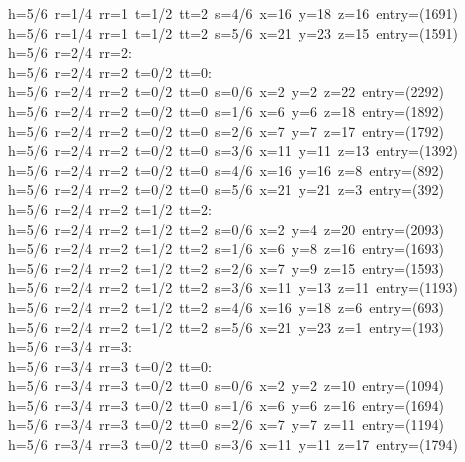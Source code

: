 \begin{tabbing}
h=5/6\ r=1/4\ rr=1\ t=1/2\ tt=2\ s=4/6\ x=16\ y=18\ z=16\ entry=(1691)\\[0pt]
h=5/6\ r=1/4\ rr=1\ t=1/2\ tt=2\ s=5/6\ x=21\ y=23\ z=15\ entry=(1591)\\[0pt]
h=5/6\ r=2/4\ rr=2:\\[0pt]
h=5/6\ r=2/4\ rr=2\ t=0/2\ tt=0:\\[0pt]
h=5/6\ r=2/4\ rr=2\ t=0/2\ tt=0\ s=0/6\ x=2\ y=2\ z=22\ entry=(2292)\\[0pt]
h=5/6\ r=2/4\ rr=2\ t=0/2\ tt=0\ s=1/6\ x=6\ y=6\ z=18\ entry=(1892)\\[0pt]
h=5/6\ r=2/4\ rr=2\ t=0/2\ tt=0\ s=2/6\ x=7\ y=7\ z=17\ entry=(1792)\\[0pt]
h=5/6\ r=2/4\ rr=2\ t=0/2\ tt=0\ s=3/6\ x=11\ y=11\ z=13\ entry=(1392)\\[0pt]
h=5/6\ r=2/4\ rr=2\ t=0/2\ tt=0\ s=4/6\ x=16\ y=16\ z=8\ entry=(892)\\[0pt]
h=5/6\ r=2/4\ rr=2\ t=0/2\ tt=0\ s=5/6\ x=21\ y=21\ z=3\ entry=(392)\\[0pt]
h=5/6\ r=2/4\ rr=2\ t=1/2\ tt=2:\\[0pt]
h=5/6\ r=2/4\ rr=2\ t=1/2\ tt=2\ s=0/6\ x=2\ y=4\ z=20\ entry=(2093)\\[0pt]
h=5/6\ r=2/4\ rr=2\ t=1/2\ tt=2\ s=1/6\ x=6\ y=8\ z=16\ entry=(1693)\\[0pt]
h=5/6\ r=2/4\ rr=2\ t=1/2\ tt=2\ s=2/6\ x=7\ y=9\ z=15\ entry=(1593)\\[0pt]
h=5/6\ r=2/4\ rr=2\ t=1/2\ tt=2\ s=3/6\ x=11\ y=13\ z=11\ entry=(1193)\\[0pt]
h=5/6\ r=2/4\ rr=2\ t=1/2\ tt=2\ s=4/6\ x=16\ y=18\ z=6\ entry=(693)\\[0pt]
h=5/6\ r=2/4\ rr=2\ t=1/2\ tt=2\ s=5/6\ x=21\ y=23\ z=1\ entry=(193)\\[0pt]
h=5/6\ r=3/4\ rr=3:\\[0pt]
h=5/6\ r=3/4\ rr=3\ t=0/2\ tt=0:\\[0pt]
h=5/6\ r=3/4\ rr=3\ t=0/2\ tt=0\ s=0/6\ x=2\ y=2\ z=10\ entry=(1094)\\[0pt]
h=5/6\ r=3/4\ rr=3\ t=0/2\ tt=0\ s=1/6\ x=6\ y=6\ z=16\ entry=(1694)\\[0pt]
h=5/6\ r=3/4\ rr=3\ t=0/2\ tt=0\ s=2/6\ x=7\ y=7\ z=11\ entry=(1194)\\[0pt]
h=5/6\ r=3/4\ rr=3\ t=0/2\ tt=0\ s=3/6\ x=11\ y=11\ z=17\ entry=(1794)\\[0pt]

\end{tabbing}
